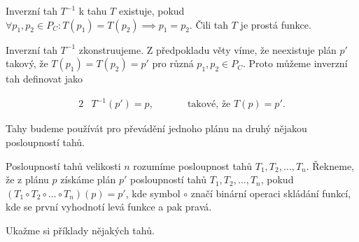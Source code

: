\begin{veta}\label{veta:inverzNutnost}
  Inverzní tah $T^{-1}$ k tahu $T$ existuje, pokud $\forall p_1, p_2 \in P_C \colon T(p_1) = T(p_2) \implies p_1 = p_2$.
  Čili tah $T$ je prostá funkce.

\end{veta}
\begin{dukaz}
  Inverzní tah $T^{-1}$ zkonstruujeme.
  Z předpokladu věty víme, že neexistuje plán $p'$ takový, že $T(p_1) = T(p_2) = p'$ pro různá $p_1, p_2 \in P_C$. 
  Proto můžeme inverzní tah definovat jako

  \begin{alignat*}{2}
    & T^{-1}(p') = p, \quad && \hspace{10pt} \text{takové, že $T(p) = p'$}.
  \end{alignat*}
\end{dukaz}

Tahy budeme používát pro převádění jednoho plánu na druhý nějakou posloupností tahů.

\begin{definice}
  Posloupností tahů velikosti $n$ rozumíme posloupnost tahů $T_1, T_2, \dots, T_n$.
  Řekneme, že z plánu $p$ získáme plán $p'$ posloupností tahů $T_1, T_2, \dots, T_n$,
  pokud $(T_1 \circ T_2 \circ \dots \circ T_n)(p) = p'$, kde symbol $\circ$ značí binární operaci skládání funkcí,
  kde se první vyhodnotí levá funkce a pak pravá.
\end{definice}

Ukažme si příklady nějakých tahů.

